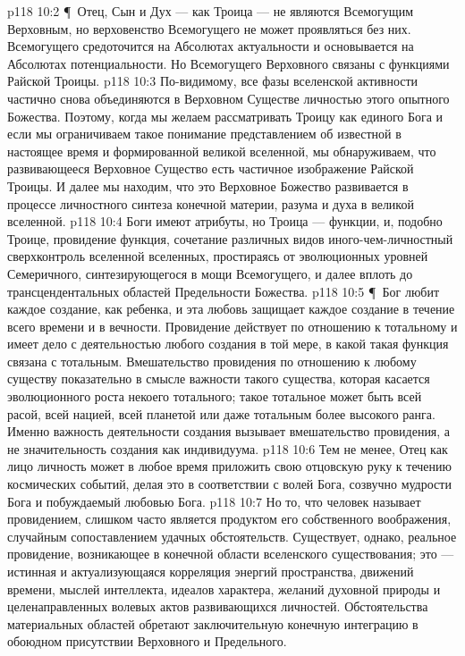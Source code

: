 \vs p118 10:2 \P\ Отец, Сын и Дух --- как Троица --- не являются Всемогущим Верховным, но верховенство Всемогущего не может проявляться без них.  Всемогущего средоточится на Абсолютах актуальности и основывается на Абсолютах потенциальности. Но  Всемогущего Верховного связаны с функциями Райской Троицы.
\vs p118 10:3 По\hyp{}видимому, все фазы вселенской активности частично снова объединяются в Верховном Существе личностью этого опытного Божества. Поэтому, когда мы желаем рассматривать Троицу как единого Бога и если мы ограничиваем такое понимание представлением об известной в настоящее время и формированной великой вселенной, мы обнаруживаем, что развивающееся Верховное Существо есть частичное изображение Райской Троицы. И далее мы находим, что это Верховное Божество развивается в процессе личностного синтеза конечной материи, разума и духа в великой вселенной.
\vs p118 10:4 Боги имеют атрибуты, но Троица --- функции, и, подобно Троице, провидение  функция, сочетание различных видов иного\hyp{}чем\hyp{}личностный сверхконтроль вселенной вселенных, простираясь от эволюционных уровней Семеричного, синтезирующегося в мощи Всемогущего, и далее вплоть до трансцендентальных областей Предельности Божества.
\vs p118 10:5 \P\ Бог любит каждое создание, как ребенка, и эта любовь защищает каждое создание в течение всего времени и в вечности. Провидение действует по отношению к тотальному и имеет дело с деятельностью любого создания в той мере, в какой такая функция связана с тотальным. Вмешательство провидения по отношению к любому существу показательно в смысле важности  такого существа, которая касается эволюционного роста некоего тотального; такое тотальное может быть всей расой, всей нацией, всей планетой или даже тотальным более высокого ранга. Именно важность деятельности создания вызывает вмешательство провидения, а не значительность создания как индивидуума.
\vs p118 10:6 Тем не менее, Отец как лицо личность может в любое время приложить свою отцовскую руку к течению космических событий, делая это в соответствии с волей Бога, созвучно мудрости Бога и побуждаемый любовью Бога.
\vs p118 10:7 Но то, что человек называет провидением, слишком часто является продуктом его собственного воображения, случайным сопоставлением удачных обстоятельств. Существует, однако, реальное провидение, возникающее в конечной области вселенского существования; это --- истинная и актуализующаяся корреляция энергий пространства, движений времени, мыслей интеллекта, идеалов характера, желаний духовной природы и целенаправленных волевых актов развивающихся личностей. Обстоятельства материальных областей обретают заключительную конечную интеграцию в обоюдном присутствии Верховного и Предельного.
